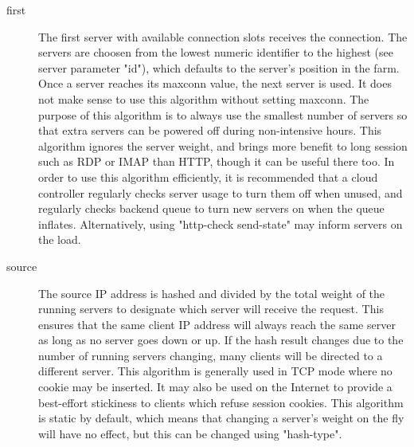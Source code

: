 \begin{description}
      \item[first]       The first server with available connection slots receives the
                  connection. The servers are choosen from the lowest numeric
                  identifier to the highest (see server parameter "id"), which
                  defaults to the server's position in the farm. Once a server
                  reaches its maxconn value, the next server is used. It does
                  not make sense to use this algorithm without setting maxconn.
                  The purpose of this algorithm is to always use the smallest
                  number of servers so that extra servers can be powered off
                  during non-intensive hours. This algorithm ignores the server
                  weight, and brings more benefit to long session such as RDP
                  or IMAP than HTTP, though it can be useful there too. In
                  order to use this algorithm efficiently, it is recommended
                  that a cloud controller regularly checks server usage to turn
                  them off when unused, and regularly checks backend queue to
                  turn new servers on when the queue inflates. Alternatively,
                  using "http-check send-state" may inform servers on the load.

      \item[source]      The source IP address is hashed and divided by the total
                  weight of the running servers to designate which server will
                  receive the request. This ensures that the same client IP
                  address will always reach the same server as long as no
                  server goes down or up. If the hash result changes due to the
                  number of running servers changing, many clients will be
                  directed to a different server. This algorithm is generally
                  used in TCP mode where no cookie may be inserted. It may also
                  be used on the Internet to provide a best-effort stickiness
                  to clients which refuse session cookies. This algorithm is
                  static by default, which means that changing a server's
                  weight on the fly will have no effect, but this can be
                  changed using "hash-type".


\end{description}
